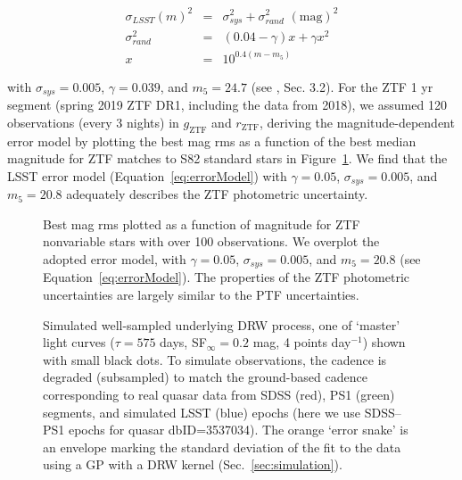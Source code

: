 \documentclass[twocolumn]{aastex62}
\begin{document}
\begin{eqnarray}
\label{eq:errorModel}
\sigma_{LSST}(m)^{2} &=& \sigma_{sys}^{2} + \sigma_{rand}^{2} \,\, \mathrm{(mag)}^{2} \\
\sigma_{rand}^{2} &=& (0.04-\gamma)x + \gamma x^{2} \nonumber \\
x &=& 10^{0.4(m-m_{5})} \nonumber
\end{eqnarray}

with  $\sigma_{sys} = 0.005$, $\gamma=0.039$, and $m_{5} = 24.7$ (see \citealt{ivezic2019}, Sec. 3.2). For the ZTF 1 yr segment (spring 2019 ZTF DR1, including the data from 2018), we assumed 120 observations (every 3 nights) in $g_{\mathrm{ZTF}}$ and $r_{\mathrm{ZTF}}$, deriving the magnitude-dependent error model by plotting the best mag rms as a function of the best median magnitude for ZTF matches to S82 standard stars in Figure~\ref{fig:ztf_errors}. We find that the LSST error model (Equation~\ref{eq:errorModel}) with $\gamma = 0.05$, $\sigma_{sys} = 0.005 $, and $m_{5} = 20.8$ adequately describes the ZTF photometric uncertainty. 


\begin{figure}
	\caption{Best mag rms plotted as a function of magnitude for ZTF nonvariable stars with over 100 observations. We overplot the adopted error model, with $\gamma = 0.05$, $\sigma_{sys} = 0.005 $, and $m_{5} = 20.8$ (see Equation~\ref{eq:errorModel}). The properties of the ZTF photometric uncertainties are largely similar to the PTF uncertainties.}
	\label{fig:ztf_errors}
\end{figure} 


\begin{figure*}
	\caption{Simulated well-sampled underlying DRW process, one of `master' light curves ($\tau=575$ days, SF$_{\infty} = 0.2$ mag, 4 points day$^{-1}$) shown with  small black dots. To simulate observations, the cadence is degraded (subsampled) to match the ground-based cadence corresponding to real quasar data from SDSS (red), PS1 (green) segments, and simulated LSST (blue) epochs (here we use SDSS--PS1 epochs for quasar dbID=3537034). The orange `error snake' is an envelope marking the standard deviation of the fit to the data using a GP with a DRW kernel (Sec.~\ref{sec:simulation}).}
	\label{fig:lc_simulated}
\end{figure*} 
\end{document}
